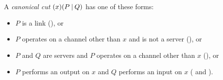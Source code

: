 \begin{code}
\>[4]\AgdaSpace{}%
\AgdaSpace{}%
\AgdaSpace{}%
\AgdaSymbol{\}}\AgdaSpace{}%
\AgdaSymbol{(}\AgdaSpace{}%
\AgdaSymbol{:}\AgdaSpace{}%
\AgdaSpace{}%
\AgdaSpace{}%
\AgdaSymbol{)}\AgdaSpace{}%
\AgdaSymbol{(}\AgdaSpace{}%
\AgdaSymbol{:}\AgdaSpace{}%
\AgdaSpace{}%
\AgdaSpace{}%
\AgdaSpace{}%
\AgdaOperator{\AgdaDatatype{+}}\AgdaSpace{}%
\AgdaSymbol{)}\<%
\\
%
\>[4]\AgdaSymbol{\{}\AgdaSpace{}%
\AgdaSymbol{:}\AgdaSpace{}%
\AgdaSpace{}%
\AgdaSymbol{(}\AgdaSpace{}%
\AgdaSpace{}%
\AgdaSymbol{)\}}\AgdaSpace{}%
\AgdaSymbol{\{}\AgdaSpace{}%
\AgdaSymbol{:}\AgdaSpace{}%
\AgdaSpace{}%
\AgdaSymbol{(}\AgdaSpace{}%
\AgdaSpace{}%
\AgdaSymbol{)\}}\AgdaSpace{}%
\<%
\\
%
\>[4]\AgdaSpace{}%
\AgdaSpace{}%
\AgdaSpace{}%
\AgdaSpace{}%
\AgdaSpace{}%
\AgdaSpace{}%
\AgdaSpace{}%
\AgdaSymbol{(}\AgdaSpace{}%
\AgdaSpace{}%
\AgdaSpace{}%
\AgdaSpace{}%
\AgdaSymbol{)}\<%
\end{code}

A \emph{canonical cut} $(x)(P\mathbin| Q)$ has one of these forms:
\begin{itemize}
\item $P$ is a link (), or
\item $P$ operates on a channel other than $x$ and is not a server
(), or
\item $P$ and $Q$ are servers and $P$ operates on a channel other than $x$
(), or
\item $P$ performs an output on $x$ and $Q$ performs an input on $x$
( and ).
\end{itemize}


